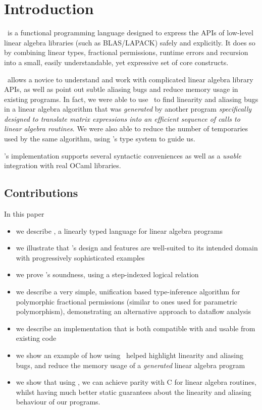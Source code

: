 \section{Introduction}

\lang\ is a functional programming language designed to express the APIs of
low-level linear algebra libraries (such as BLAS/LAPACK) safely and explicitly.
It does so by combining linear types, fractional permissions, runtime errors
and recursion into a small, easily understandable, yet expressive set of core
constructs.

\lang\ allows a novice to understand and work with complicated linear algebra
library APIs, as well as point out subtle aliasing bugs and reduce memory usage
in existing programs. In fact, we were able to use \lang\ to find linearity and
aliasing bugs in a linear algebra algorithm that was \emph{generated} by
another program \emph{specifically designed to translate matrix expressions
into an efficient sequence of calls to linear algebra routines}. We were also
able to reduce the number of temporaries used by the same algorithm, using
\lang's type system to guide us.

\lang's implementation supports several syntactic conveniences as well as a
\emph{usable} integration with real OCaml libraries.

\subsection{Contributions}

In this paper
\begin{itemize}
    \item we describe \lang, a linearly typed language for linear algebra programs
    \item we illustrate that \lang's design and features are well-suited to its
        intended domain with progressively sophisticated examples
    \item we prove \lang's soundness, using a step-indexed logical relation
    \item we describe a very simple, unification based type-inference algorithm
        for polymorphic fractional permissions (similar to ones used for
        parametric polymorphism), demonstrating an alternative approach to
        dataflow analysis \cite{bierhoff}
    \item we describe an implementation that is both compatible with and usable
        from existing code
    \item we show an example of how using \lang\ helped highlight linearity
        and aliasing bugs, and reduce the memory usage of a \emph{generated}
        linear algebra program
    \item we show that using \lang, we can achieve parity with C for linear
        algebra routines, whilst having much better static guarantees about the
        linearity and aliasing behaviour of our programs.
\end{itemize}

